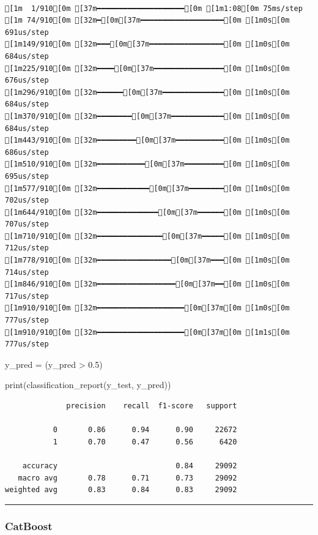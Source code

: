\documentclass[
  letterpaper,
  DIV=11,
  numbers=noendperiod]{scrartcl}
\newenvironment{Shaded}{\begin{snugshade}}{\end{snugshade}}
\newcommand{\BuiltInTok}[1]{\textcolor[rgb]{0.00,0.23,0.31}{#1}}
\newcommand{\FloatTok}[1]{\textcolor[rgb]{0.68,0.00,0.00}{#1}}
\newcommand{\NormalTok}[1]{\textcolor[rgb]{0.00,0.23,0.31}{#1}}
\newcommand{\OperatorTok}[1]{\textcolor[rgb]{0.37,0.37,0.37}{#1}}
\begin{document}
\begin{verbatim}

[1m  1/910[0m [37m━━━━━━━━━━━━━━━━━━━━[0m [1m1:08[0m 75ms/step
[1m 74/910[0m [32m━[0m[37m━━━━━━━━━━━━━━━━━━━[0m [1m0s[0m 691us/step 
[1m149/910[0m [32m━━━[0m[37m━━━━━━━━━━━━━━━━━[0m [1m0s[0m 684us/step
[1m225/910[0m [32m━━━━[0m[37m━━━━━━━━━━━━━━━━[0m [1m0s[0m 676us/step
[1m296/910[0m [32m━━━━━━[0m[37m━━━━━━━━━━━━━━[0m [1m0s[0m 684us/step
[1m370/910[0m [32m━━━━━━━━[0m[37m━━━━━━━━━━━━[0m [1m0s[0m 684us/step
[1m443/910[0m [32m━━━━━━━━━[0m[37m━━━━━━━━━━━[0m [1m0s[0m 686us/step
[1m510/910[0m [32m━━━━━━━━━━━[0m[37m━━━━━━━━━[0m [1m0s[0m 695us/step
[1m577/910[0m [32m━━━━━━━━━━━━[0m[37m━━━━━━━━[0m [1m0s[0m 702us/step
[1m644/910[0m [32m━━━━━━━━━━━━━━[0m[37m━━━━━━[0m [1m0s[0m 707us/step
[1m710/910[0m [32m━━━━━━━━━━━━━━━[0m[37m━━━━━[0m [1m0s[0m 712us/step
[1m778/910[0m [32m━━━━━━━━━━━━━━━━━[0m[37m━━━[0m [1m0s[0m 714us/step
[1m846/910[0m [32m━━━━━━━━━━━━━━━━━━[0m[37m━━[0m [1m0s[0m 717us/step
[1m910/910[0m [32m━━━━━━━━━━━━━━━━━━━━[0m[37m[0m [1m0s[0m 777us/step
[1m910/910[0m [32m━━━━━━━━━━━━━━━━━━━━[0m[37m[0m [1m1s[0m 777us/step
\end{verbatim}

\begin{Shaded}
\begin{Highlighting}[]
\NormalTok{y\_pred }\OperatorTok{=}\NormalTok{ (y\_pred }\OperatorTok{\textgreater{}} \FloatTok{0.5}\NormalTok{)}

\BuiltInTok{print}\NormalTok{(classification\_report(y\_test, y\_pred))}
\end{Highlighting}
\end{Shaded}

\begin{verbatim}
              precision    recall  f1-score   support

           0       0.86      0.94      0.90     22672
           1       0.70      0.47      0.56      6420

    accuracy                           0.84     29092
   macro avg       0.78      0.71      0.73     29092
weighted avg       0.83      0.84      0.83     29092
\end{verbatim}

\begin{center}\rule{0.5\linewidth}{0.5pt}\end{center}

\hypertarget{catboost}{%
\subsubsection{CatBoost}\label{catboost}}
\end{document}
